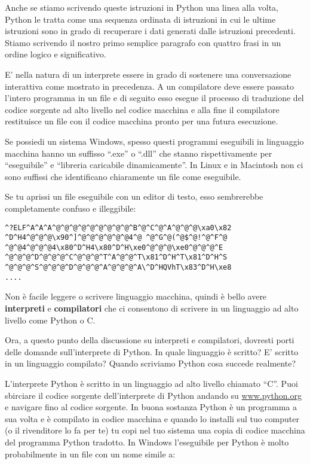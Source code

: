 Anche se stiamo scrivendo queste istruzioni in Python una linea alla volta, Python le tratta come una sequenza ordinata di istruzioni in cui le ultime istruzioni sono in grado di recuperare i dati generati dalle istruzioni precedenti. Stiamo scrivendo il nostro primo semplice paragrafo con quattro frasi in un ordine logico e significativo.


E' nella natura di un interprete essere in grado di sostenere una conversazione interattiva come mostrato in precedenza. A un compilatore deve essere passato l'intero programma in un file e di seguito esso esegue il processo di traduzione del codice sorgente ad alto livello nel codice macchina e alla fine il compilatore restituisce un file con il codice macchina pronto per una futura esecuzione.


Se possiedi un sistema Windows, spesso questi programmi eseguibili in linguaggio macchina hanno un suffisso {``}.exe'' o {``}.dll'' che stanno rispettivamente per {``}eseguibile'' e {``}libreria caricabile dinamicamente''. In Linux e in Macintosh non ci sono suffissi che identificano chiaramente un file come eseguibile.


Se tu aprissi un file eseguibile con un editor di testo, esso sembrerebbe completamente confuso e illeggibile:

\beforeverb
\begin{verbatim}
^?ELF^A^A^A^@^@^@^@^@^@^@^@^@^B^@^C^@^A^@^@^@\xa0\x82
^D^H4^@^@^@\x90^]^@^@^@^@^@^@4^@ ^@^G^@(^@$^@!^@^F^@
^@^@4^@^@^@4\x80^D^H4\x80^D^H\xe0^@^@^@\xe0^@^@^@^E
^@^@^@^D^@^@^@^C^@^@^@^T^A^@^@^T\x81^D^H^T\x81^D^H^S
^@^@^@^S^@^@^@^D^@^@^@^A^@^@^@^A\^D^HQVhT\x83^D^H\xe8
....
\end{verbatim}
\afterverb
%
Non \`{e} facile leggere o scrivere linguaggio macchina, quindi \`{e} bello avere \textbf{interpreti }e \textbf{compilatori }che ci consentono di scrivere in un linguaggio ad alto livello come Python o C.


Ora, a questo punto della discussione su interpreti e compilatori, dovresti porti delle domande sull'interprete di Python. In quale linguaggio \`{e} scritto? E' scritto in un linguaggio compilato? Quando scriviamo Python cosa succede realmente?

L'interprete Python \`{e} scritto in un linguaggio ad alto livello chiamato {``}C''. Puoi sbirciare il codice sorgente dell'interprete di Python andando su  \url{www.python.org} e navigare fino al codice sorgente. In buona sostanza Python \`{e} un programma a sua volta e \`{e} compilato in codice macchina e quando lo installi sul tuo computer (o il rivenditore lo fa per te) tu copi nel tuo sistema una copia di codice macchina del programma Python tradotto. In Windows l'eseguibile per Python \`{e} molto probabilmente in un file con un nome simile a:

